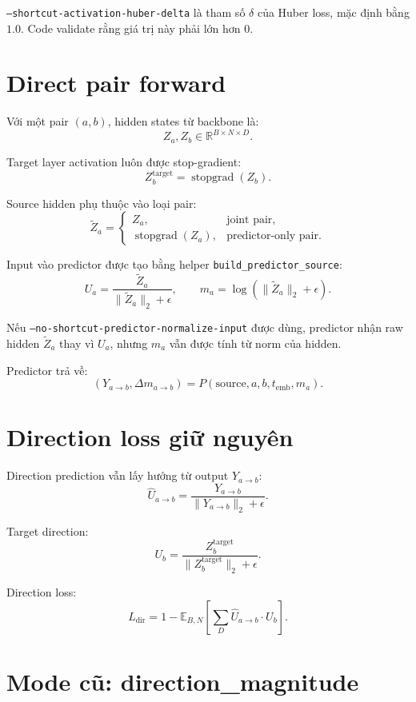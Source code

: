 \documentclass[11pt]{article}
\begin{document}
\texttt{--shortcut-activation-huber-delta} là tham số \(\delta\) của Huber loss, mặc định bằng \(1.0\).
Code validate rằng giá trị này phải lớn hơn \(0\).

\section{Direct pair forward}

Với một pair \((a,b)\), hidden states từ backbone là:
\[
Z_a, Z_b \in \mathbb{R}^{B \times N \times D}.
\]

Target layer activation luôn được stop-gradient:
\[
Z_b^{\text{target}} = \operatorname{stopgrad}(Z_b).
\]

Source hidden phụ thuộc vào loại pair:
\[
\tilde{Z}_a =
\begin{cases}
Z_a, & \text{joint pair},\\
\operatorname{stopgrad}(Z_a), & \text{predictor-only pair}.
\end{cases}
\]

Input vào predictor được tạo bằng helper \texttt{build\_predictor\_source}:
\[
U_a = \frac{\tilde{Z}_a}{\|\tilde{Z}_a\|_2 + \epsilon},
\qquad
m_a = \log(\|\tilde{Z}_a\|_2 + \epsilon).
\]

Nếu \texttt{--no-shortcut-predictor-normalize-input} được dùng, predictor nhận raw hidden \(\tilde{Z}_a\) thay vì \(U_a\), nhưng \(m_a\) vẫn được tính từ norm của hidden.

Predictor trả về:
\[
(Y_{a \rightarrow b}, \Delta m_{a \rightarrow b})
=
P(\text{source}, a, b, t_{\text{emb}}, m_a).
\]

\section{Direction loss giữ nguyên}

Direction prediction vẫn lấy hướng từ output \(Y_{a \rightarrow b}\):
\[
\hat{U}_{a \rightarrow b}
=
\frac{Y_{a \rightarrow b}}{\|Y_{a \rightarrow b}\|_2 + \epsilon}.
\]

Target direction:
\[
U_b
=
\frac{Z_b^{\text{target}}}{\|Z_b^{\text{target}}\|_2 + \epsilon}.
\]

Direction loss:
\[
L_{\text{dir}}
=
1 -
\mathbb{E}_{B,N}
\left[
\sum_D
\hat{U}_{a \rightarrow b} \cdot U_b
\right].
\]

\section{Mode cũ: direction\_magnitude}
\end{document}
